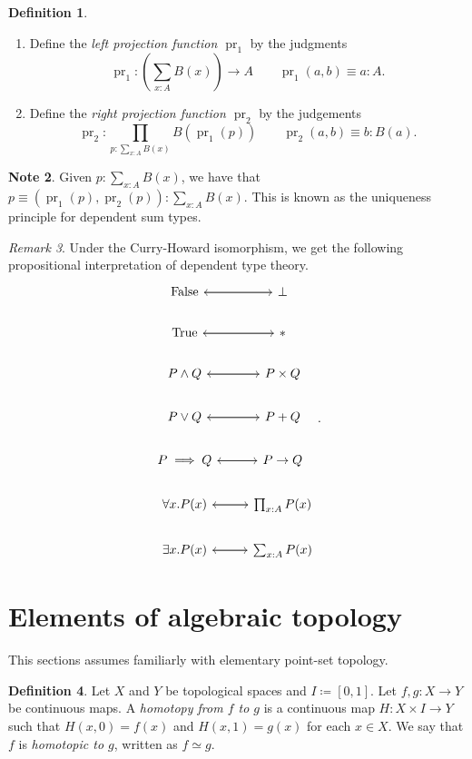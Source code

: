 \documentclass[10pt,letterpaper,cm]{nupset}
\theoremstyle{definition}
\newtheorem{definition}{Definition}[subsection]
\newtheorem{note}[definition]{Note}
\theoremstyle{theorem}
\theoremstyle{remark}
\newtheorem{remark}[definition]{Remark}
\newcommand{\1}{\mathbf{1}}
\newcommand{\0}{\vec 0}
\DeclareMathOperator{\pr}{pr}
\begin{document}
\begin{definition} $ $
\begin{enumerate}
\item Define the \textit{left projection function $\pr_1$} by the judgments $$\pr_1 : \left (\sum_{x:A}B(x) \right) \to A  \quad \quad \pr_1(a,b) \equiv a: A.$$
\item Define the \textit{right projection function $\pr_2$} by the judgements  $$ \pr_2 : \prod_{p: \sum_{x:A}B(x)} B(\pr_1(p)) \quad \quad \pr_2(a,b) \equiv b :B(a). $$
\end{enumerate}
\end{definition}

\begin{note}
Given $p: \sum_{x:A} B(x)$, we have that $p\equiv (\pr_1(p), \pr_2(p)) : \sum_{x:A}B(x)$. This is known as the uniqueness principle for dependent sum types.
\end{note}

\begin{remark}
Under the Curry-Howard isomorphism, we get the following propositional interpretation of dependent type theory.
\[
\begin{tikzcd}
\text{False} \arrow[r] & \bot \arrow[l] \\
\text{True} \arrow[r] & \ast \arrow[l] \\
P \land Q \arrow[r] & P\times Q \arrow[l] \\
P\vee Q \arrow[r] & P + Q \arrow[l] \\
P \implies Q \arrow[r] & P \to Q \arrow[l] \\
\forall x.P(x) \arrow[r] & \prod_{x:A}P(x) \arrow[l] \\
\exists x. P(x) \arrow[r] & \sum_{x:A}P(x) \arrow[l]
\end{tikzcd}
.\]
\end{remark}


\section{Elements of algebraic topology}

This sections assumes familiarly with elementary point-set topology.

\begin{definition}
Let $X$ and $Y$ be topological spaces and $I\coloneqq [0,1]$. Let $f,g: X \to Y$ be continuous maps. A \textit{homotopy from $f$ to $g$} is a continuous map $H: X \times I \to Y$ such that $H(x,0) = f(x)$ and $H(x,1) = g(x)$ for each $x\in X$. We say that $f$ is \textit{homotopic to $g$}, written as $f\simeq g$.
\end{definition}
\end{document}
